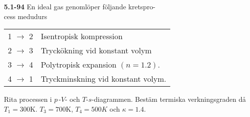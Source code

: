 \documentclass[twocolumn]{book}
\begin{document}
\bigskip
\noindent\textbf{5.1-94}\hfill\break
\noindent En ideal gas genomlöper följande kretspro-\\
cess medudurs
\begin{table}[ht]
\noindent\begin{tabular}{ l l  } 
1 $\rightarrow$ 2 & Isentropisk kompression\\
2 $\rightarrow$ 3 & Tryckökning vid konstant volym  \\ 
3 $\rightarrow$ 4 & Polytropisk expansion $(n=1.2)$.\\
4 $\rightarrow$ 1 & Tryckminskning vid konstant volym.\\                
\end{tabular}
\end{table}

Rita processen i $p$\,-$V$- och $T$-$s$-diagrammen.
Bestäm termiska verkningsgraden då $T_1=300$K. $T_3=700$K, $T_4=500K$ och $\kappa=1.4$.
\bigskip
\end{document}
